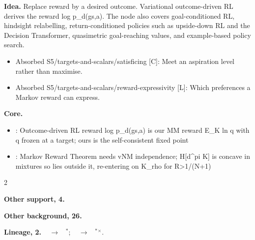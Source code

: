 \documentclass[10pt]{article}
\newcommand{\memb}[1]{\par\smallskip\textbf{#1}\quad}
\begin{document}
\textbf{Idea.} Replace reward by a desired outcome. Variational outcome-driven RL derives the reward log p\_d(g\textbar{}s,a). The node also covers goal-conditioned RL, hindsight relabelling, return-conditioned policies such as upside-down RL and the Decision Transformer, quasimetric goal-reaching values, and example-based policy search.
\begin{itemize}[nosep,leftmargin=1.2em]
\item Absorbed S5/targets-and-scalars/satisficing [C]: Meet an aspiration level rather than maximise.
\item Absorbed S5/targets-and-scalars/reward-expressivity [L]: Which preferences a Markov reward can express.
\end{itemize}


\memb{Core.}
\begin{itemize}[nosep,leftmargin=1.2em]
\item \citet{Rudner-outcomedriven21}: Outcome-driven RL reward log p\_d(g\textbar{}s,a) is our MM reward E\_K ln q with q frozen at a target; ours is the self-consistent fixed point
\item \citet{Bowling-settling23}: Markov Reward Theorem needs vNM independence; H[d\^{}pi K] is concave in mixtures so lies outside it, re-entering on K\_rho for R\textgreater{}1/(N+1)
\end{itemize}
\begin{multicols}{2}
\memb{Other support, 4.} \citetext{\citealp{Eysenbach-imitating22}; \citealp{Simon-behavioral55}; \citealp{Taylor-quantilizers16}; \citealp{Dima-nonmaximizing24}}

\memb{Other background, 26.} {\footnotesize \citetext{\citealp{Kaelbling-learning93}\dag; \citealp{Andrychowicz-hindsight17}; \citealp{Schmidhuber-reinforcement19}; \citealp{Chen-decision21}; \citealp{Eysenbach-replacing21}; \citealp{Nasiriany-disco21}; \citealp{Liu-goal22}; \citealp{Zhang-understanding22}; \citealp{Wang-optimal23}; \citealp{Simon-rational56}; \citealp{Reverdy-satisficing17}; \citealp{Miryoosefi-reinforcement19}; \citealp{Tamatsukuri-guaranteed19}; \citealp{Russo-satisficing22}; \citealp{Corlay-minimizing23}; \citealp{Arumugam-satisficing24}; \citealp{Vamplew-empirical11}; \citealp{Roijers-survey13}; \citealp{VanMoffaert-scalarized13}\dag; \citealp{Pitis-rethinking19}; \citealp{Abel-expressivity21}; \citealp{Silver-reward21}; \citealp{Hayes-practical22}; \citealp{Skalse-lexicographic22}; \citealp{Vamplew-scalar22}; \citealp{Subramani-expressivity23}}}

\end{multicols}
\memb{Lineage, 2.} {\footnotesize \citeauthor{Schmidhuber-reinforcement19}~\citeyear{Schmidhuber-reinforcement19} $\to$ \citeauthor{Chen-decision21}~\citeyear{Chen-decision21}$^\ast$; \citeauthor{Rudner-outcomedriven21}~\citeyear{Rudner-outcomedriven21} $\to$ \citeauthor{Lee-efficient19}~\citeyear{Lee-efficient19}$^\ast$$^\times$.}
\end{document}
